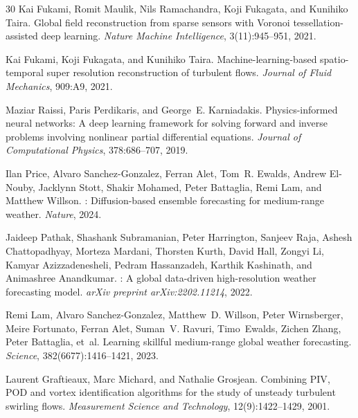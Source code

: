 \documentclass{article}
\begin{document}
\begin{thebibliography}{30}
Kai Fukami, Romit Maulik, Nils Ramachandra, Koji Fukagata, and Kunihiko Taira.
\newblock Global field reconstruction from sparse sensors with {V}oronoi tessellation-assisted deep learning.
\newblock \emph{Nature Machine Intelligence}, 3(11):945--951, 2021.

Kai Fukami, Koji Fukagata, and Kunihiko Taira.
\newblock Machine-learning-based spatio-temporal super resolution reconstruction of turbulent flows.
\newblock \emph{Journal of Fluid Mechanics}, 909:A9, 2021.

Maziar Raissi, Paris Perdikaris, and George~E. Karniadakis.
\newblock Physics-informed neural networks: A deep learning framework for solving forward and inverse problems involving nonlinear partial differential equations.
\newblock \emph{Journal of Computational Physics}, 378:686--707, 2019.

Ilan Price, Alvaro Sanchez-Gonzalez, Ferran Alet, Tom~R. Ewalds, Andrew El-Nouby, Jacklynn Stott, Shakir Mohamed, Peter Battaglia, Remi Lam, and Matthew Willson.
: Diffusion-based ensemble forecasting for medium-range weather.
\newblock \emph{Nature}, 2024.

Jaideep Pathak, Shashank Subramanian, Peter Harrington, Sanjeev Raja, Ashesh Chattopadhyay, Morteza Mardani, Thorsten Kurth, David Hall, Zongyi Li, Kamyar Azizzadenesheli, Pedram Hassanzadeh, Karthik Kashinath, and Animashree Anandkumar.
: A global data-driven high-resolution weather forecasting model.
\newblock \emph{arXiv preprint arXiv:2202.11214}, 2022.

Remi Lam, Alvaro Sanchez-Gonzalez, Matthew~D. Willson, Peter Wirnsberger, Meire Fortunato, Ferran Alet, Suman~V. Ravuri, Timo~Ewalds, Zichen Zhang, Peter Battaglia, et~al.
\newblock Learning skillful medium-range global weather forecasting.
\newblock \emph{Science}, 382(6677):1416--1421, 2023.

Laurent Graftieaux, Marc Michard, and Nathalie Grosjean.
\newblock Combining {PIV}, {POD} and vortex identification algorithms for the study of unsteady turbulent swirling flows.
\newblock \emph{Measurement Science and Technology}, 12(9):1422--1429, 2001.


\end{thebibliography}
\end{document}
